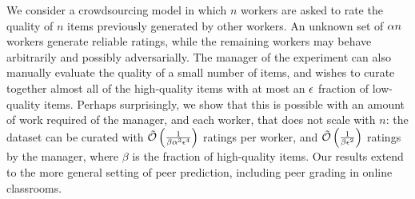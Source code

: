 We consider a crowdsourcing model in which $n$ workers are asked to 
rate the quality of $n$ items previously generated by other workers.
An unknown set of $\alpha n$ workers generate reliable ratings, 
while the remaining workers may behave arbitrarily and possibly adversarially. 
The manager of the experiment can also manually evaluate the quality of a 
small number of items, and wishes to curate together almost all 
of the high-quality items with at most an $\epsilon$ fraction of 
low-quality items.  
Perhaps surprisingly, we show that this is possible with an 
amount of work required of the manager, and each worker, that does not scale 
with $n$: the dataset can be curated with
$\tilde{\mathcal{O}}\left( \frac{1}{\beta\alpha^3\epsilon^4} \right)$ 
ratings per worker, and $\tilde{\mathcal{O}}\left( \frac{1}{\beta\epsilon^2} \right)$ 
ratings by the manager, where $\beta$ is the fraction of 
high-quality items.
Our results extend to the more general setting of peer prediction, 
including peer grading in online classrooms.

